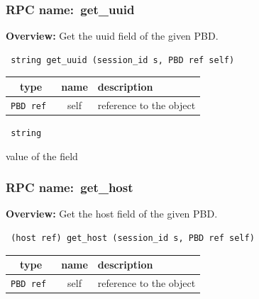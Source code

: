 \subsubsection{RPC name:~get\_uuid}

{\bf Overview:} 
Get the uuid field of the given PBD.

\begin{verbatim} string get_uuid (session_id s, PBD ref self)\end{verbatim}



 
\vspace{0.3cm}
\begin{tabular}{|c|c|p{7cm}|}
 \hline
{\bf type} & {\bf name} & {\bf description} \\ \hline
{\tt PBD ref } & self & reference to the object \\ \hline 

\end{tabular}

\vspace{0.3cm}

{\tt 
string
}


value of the field
\vspace{0.3cm}
\vspace{0.3cm}
\vspace{0.3cm}
\subsubsection{RPC name:~get\_host}

{\bf Overview:} 
Get the host field of the given PBD.

\begin{verbatim} (host ref) get_host (session_id s, PBD ref self)\end{verbatim}



 
\vspace{0.3cm}
\begin{tabular}{|c|c|p{7cm}|}
 \hline
{\bf type} & {\bf name} & {\bf description} \\ \hline
{\tt PBD ref } & self & reference to the object \\ \hline 

\end{tabular}

\vspace{0.3cm}

